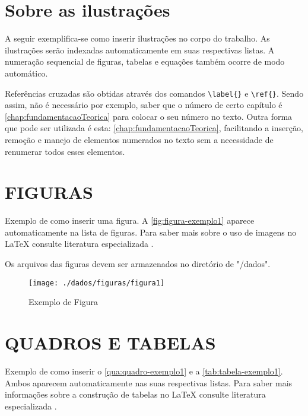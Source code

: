 

\chapter{Sobre as ilustrações}
\label{chap:apSobreIlust}

A seguir exemplifica-se como inserir ilustrações no corpo do trabalho. As ilustrações serão indexadas automaticamente em suas respectivas listas. A numeração sequencial de figuras, tabelas e equações também ocorre de modo automático.

Referências cruzadas são obtidas através dos comandos \verb|\label{}| e \verb|\ref{}|. Sendo assim, não é necessário por exemplo, saber que o número de certo capítulo é \ref{chap:fundamentacaoTeorica} para colocar o seu número no texto. Outra forma que pode ser utilizada é esta: \autoref{chap:fundamentacaoTeorica}, facilitando a inserção, remoção e manejo de elementos numerados no texto sem a necessidade de renumerar todos esses elementos.

\chapter{FIGURAS}
\label{chap:figuras}

Exemplo de como inserir uma figura. A \autoref{fig:figura-exemplo1} aparece automaticamente na lista de figuras. Para saber mais sobre o uso de imagens no \LaTeX{} consulte literatura especializada \cite{Goossens2007}.

Os arquivos das figuras devem ser armazenados no diretório de "/dados".

\begin{figure}[!htb]
    \centering
    \caption{Exemplo de Figura}
    \texttt{[image: ./dados/figuras/figura1]}
    \label{fig:figura-exemplo1}
\end{figure}

\chapter{QUADROS E TABELAS}
\label{chap:tabelas}

Exemplo de como inserir o \autoref{qua:quadro-exemplo1} e a \autoref{tab:tabela-exemplo1}. Ambos aparecem automaticamente nas suas respectivas listas. Para saber mais informações sobre a construção de tabelas no \LaTeX{} consulte literatura especializada \cite{Mittelbach2004}.

